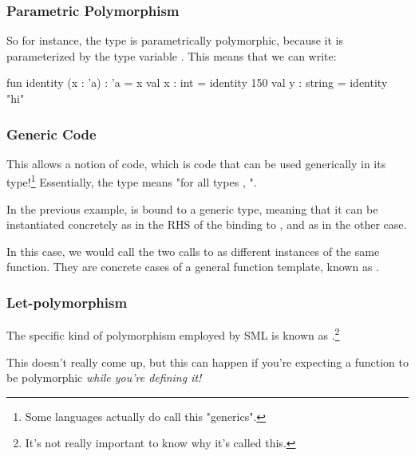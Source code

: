 \documentclass[aspectratio=169, handout]{beamer}
\begin{document}
\begin{frame}[fragile]
  \frametitle{Parametric Polymorphism}


  \pause
  \vspace{\fill}

  So for instance, the type  is parametrically polymorphic,
  because it is parameterized by the type variable . This means
  that we can write:

  \pause
  \vspace{\fill}

  \begin{codeblock}
    fun identity (x : 'a) : 'a = x
    val x : int = identity 150
    val y : string = identity "hi"
  \end{codeblock}
\end{frame}

\begin{frame}[fragile]
  \frametitle{Generic Code}

  This allows a notion of  code, which is code that can be
  used generically in its type!\footnote{
    Some languages actually do call this "generics".
  } Essentially, the type
   means "for all types , ".

  \pause
  \vspace{\fill}

  In the previous example,  is bound to a generic type, meaning
  that it can be instantiated concretely as  in the RHS of
  the binding to , and as  in the other case.

  \pause
  \vspace{\fill}

  In this case, we would call the two calls to  as different
  instances of the same function. They are concrete cases of a general
  function template, known as .
\end{frame}

\begin{frame}[fragile]
  \frametitle{Let-polymorphism}

  The specific kind of polymorphism employed by SML is known as .\footnote{
    It's not really important to know why it's called this.
  }

  \pause
  \vspace{\fill}


  \pause
  \vspace{\fill}

  This doesn't really come up, but this can happen if you're expecting a
  function to be polymorphic \textit{while you're defining it!}
\end{frame}
\end{document}
